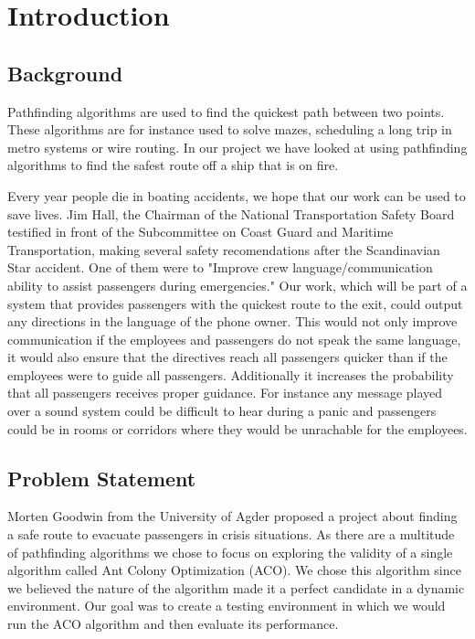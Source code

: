 \chapter{Introduction}
\label{ch:introduction}

\section{Background}

Pathfinding algorithms are used to find the quickest path between two points. 
These algorithms are for instance used to solve mazes, scheduling a long trip in
metro systems or wire routing. In our project we have looked at using pathfinding
algorithms to find the safest route off a ship that is on fire.

Every year people die in boating accidents, we hope that our work can be
used to save lives. Jim Hall, the Chairman of the National Transportation 
Safety Board testified in front of the Subcommittee on Coast Guard and Maritime 
Transportation, making several safety recomendations after the Scandinavian Star
accident. One of them were to "Improve crew language/communication 
ability to assist passengers during emergencies." Our work, which will be part of a system
that provides passengers with the quickest route to the exit, could output 
any directions in the language of the phone owner. This would not only improve 
communication if the employees and passengers do not speak the same language, 
it would also ensure that the directives reach all passengers quicker than if the employees 
were to guide all passengers. Additionally it increases the probability that all passengers 
receives proper guidance. For instance any message played over a sound system could be
difficult to hear during a panic and passengers could be in rooms or corridors
where they would be unrachable for the employees.

\section{Problem Statement}

Morten Goodwin from the University of Agder proposed a project about finding a safe route
to evacuate passengers in crisis situations. As there are a multitude of pathfinding algorithms
we chose to focus on exploring the validity of a single algorithm called Ant Colony Optimization 
(ACO). We chose this algorithm since we believed the nature of the algorithm made it a perfect
candidate in a dynamic environment. Our goal was to create a testing environment in which 
we would run the ACO algorithm and then evaluate its performance.

